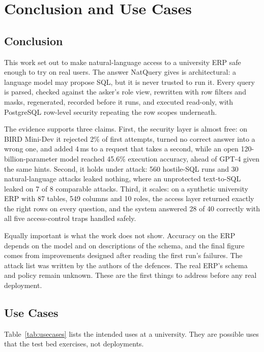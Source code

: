 \chapter{Conclusion and Use Cases}
\label{ch:conclusion}

\section{Conclusion}

This work set out to make natural-language access to a university ERP safe enough to try on real users.
The answer NatQuery gives is architectural: a language model may propose SQL, but it is never trusted to
run it. Every query is parsed, checked against the asker's role view, rewritten with row filters and
masks, regenerated, recorded before it runs, and executed read-only, with PostgreSQL row-level security
repeating the row scopes underneath.

The evidence supports three claims. First, the security layer is almost free: on BIRD Mini-Dev it
rejected 2\% of first attempts, turned no correct answer into a wrong one, and added 4\,ms to a request
that takes a second, while an open 120-billion-parameter model reached 45.6\% execution accuracy, ahead of
GPT-4 given the same hints. Second, it holds under attack: 560 hostile-SQL runs and 30 natural-language
attacks leaked nothing, where an unprotected text-to-SQL leaked on 7 of 8 comparable attacks. Third, it
scales: on a synthetic university ERP with 87 tables, 549 columns and 10 roles, the access layer returned
exactly the right rows on every question, and the system answered 28 of 40 correctly with all five
access-control traps handled safely.

Equally important is what the work does not show. Accuracy on the ERP depends on the model and on
descriptions of the schema, and the final figure comes from improvements designed after reading the
first run's failures. The attack list was written by the authors of the defences. The real ERP's schema
and policy remain unknown. These are the first things to address before any real deployment.

\section{Use Cases}

Table~\ref{tab:usecases} lists the intended uses at a university. They are possible uses that the test
bed exercises, not deployments.

